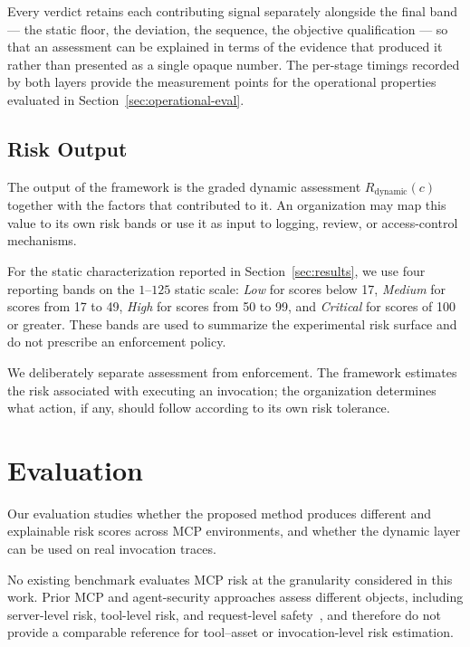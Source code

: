 \documentclass[sigconf]{acmart}
\begin{document}
Every verdict retains each contributing signal separately alongside the final
band --- the static floor, the deviation, the sequence, the objective
qualification --- so that an assessment can be explained in terms of the
evidence that produced it rather than presented as a single opaque number. The
per-stage timings recorded by both layers provide the measurement points for
the operational properties evaluated in Section~\ref{sec:operational-eval}.


\subsection{Risk Output}
\label{sec:risk-output}

The output of the framework is the graded dynamic assessment
$R_{\mathrm{dynamic}}(c)$ together with the factors that contributed to it.
An organization may map this value to its own risk bands or use it as input
to logging, review, or access-control mechanisms.

For the static characterization reported in
Section~\ref{sec:results}, we use four reporting bands on the $1$--$125$
static scale: \emph{Low} for scores below 17, \emph{Medium} for scores from
17 to 49, \emph{High} for scores from 50 to 99, and \emph{Critical} for
scores of 100 or greater. These bands are used to summarize the experimental
risk surface and do not prescribe an enforcement policy.

We deliberately separate assessment from enforcement. The framework estimates
the risk associated with executing an invocation; the organization determines
what action, if any, should follow according to its own risk tolerance.


\section{Evaluation}
\label{sec:evaluation}

Our evaluation studies whether the proposed method produces different and
explainable risk scores across MCP environments, and whether the dynamic layer
can be used on real invocation traces.

No existing benchmark evaluates MCP risk at the granularity considered in this work. Prior MCP and agent-security approaches assess different objects, including server-level risk, tool-level risk, and request-level safety~\cite{kumar2026mcpinsos,betser2026agentrim,zhang2026stars}, and therefore do not provide a comparable reference for tool--asset or invocation-level risk estimation. 
\end{document}
